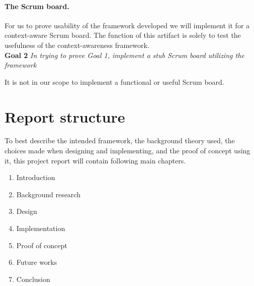 \documentclass[../report.tex]{subfiles}
\begin{document}
\paragraph{The Scrum board.} 
For us to prove usability of the framework developed we will implement it for a context-aware Scrum board. The function of this artifact is solely to test the usefulness of the context-awareness framework.\\

\textbf{Goal 2} \textit{In trying to prove Goal 1, implement a stub Scrum board utilizing the framework}

It is not in our scope to implement a functional or useful Scrum board.

\section{Report structure}

To best describe the intended framework, the background theory used, the choices made when designing and implementing, and the proof of concept using it, this project report will contain following main chapters.

\begin{enumerate}
\item Introduction
\item Background research
\item Design
\item Implementation
\item Proof of concept
\item Future works
\item Conclusion
\end{enumerate}
\end{document}
